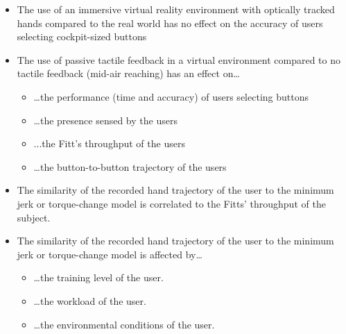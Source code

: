 \begin{itemize}
\item
  The use of an immersive virtual reality environment with optically tracked hands compared to the real world has no effect on the accuracy of users selecting cockpit-sized buttons
\item
  The use of passive tactile feedback in a virtual environment compared to no tactile feedback (mid-air reaching) has an effect on\ldots{}
  \begin{itemize}
  \item \ldots{}the performance (time and accuracy) of users selecting buttons
  \item \ldots{}the presence sensed by the users
  \item ...the Fitt's throughput of the users
  \item \ldots{}the button-to-button trajectory of the users
  \end{itemize}
\item The similarity of the recorded hand trajectory of the user to the minimum jerk or torque-change model is correlated to the Fitts' throughput of the subject.
\item The similarity of the recorded hand trajectory of the user to the minimum jerk or torque-change model is affected by\ldots{}
  \begin{itemize}
  \item \ldots{}the training level of the user.
  \item \ldots{}the workload of the user.
  \item \ldots{}the environmental conditions of the user.
  \end{itemize}
\end{itemize}

